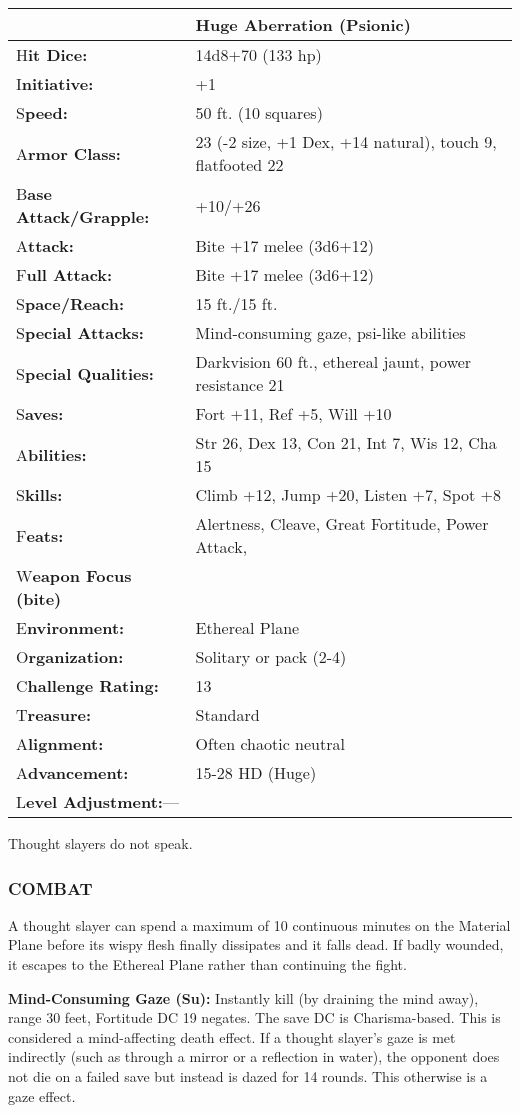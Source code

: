 \documentclass{article}
\begin{document}
\begin{tabular}{|>{\raggedright}p{91pt}|>{\raggedright}p{222pt}|}
\hline
  & Huge Aberration (Psionic)\tabularnewline
\hline
H\textbf{it Dice:} & 14d8+70 (133 hp)\tabularnewline
\hline
I\textbf{nitiative:} & +1\tabularnewline
\hline
S\textbf{peed:} & 50 ft. (10 squares)\tabularnewline
\hline
A\textbf{rmor Class:} & 23 (-2 size, +1 Dex, +14 natural), touch 9, flatfooted 
22\tabularnewline
\hline
B\textbf{ase Attack/Grapple:} & +10/+26\tabularnewline
\hline
A\textbf{ttack:} & Bite +17 melee (3d6+12)\tabularnewline
\hline
F\textbf{ull Attack:} & Bite +17 melee (3d6+12)\tabularnewline
\hline
S\textbf{pace/Reach:} & 15 ft./15 ft.\tabularnewline
\hline
S\textbf{pecial Attacks:} & Mind-consuming gaze, psi-like abilities\tabularnewline
\hline
S\textbf{pecial Qualities:} & Darkvision 60 ft., ethereal jaunt, power resistance 
21\tabularnewline
\hline
S\textbf{aves:} & Fort +11, Ref +5, Will +10\tabularnewline
\hline
A\textbf{bilities:} & Str 26, Dex 13, Con 21, Int 7, Wis 12, Cha 15\tabularnewline
\hline
S\textbf{kills:} & Climb +12, Jump +20, Listen +7, Spot +8\tabularnewline
\hline
F\textbf{eats:} & Alertness, Cleave, Great Fortitude, Power Attack,\tabularnewline
\hline
W\textbf{eapon Focus (bite)} & \tabularnewline
\hline
E\textbf{nvironment:} & Ethereal Plane\tabularnewline
\hline
O\textbf{rganization:} & Solitary or pack (2-4)\tabularnewline
\hline
C\textbf{hallenge Rating:} & 13\tabularnewline
\hline
T\textbf{reasure:} & Standard\tabularnewline
\hline
A\textbf{lignment:} & Often chaotic neutral\tabularnewline
\hline
A\textbf{dvancement:} & 15-28 HD (Huge)\tabularnewline
\hline
L\textbf{evel Adjustment:}--- & \tabularnewline
\hline
\end{tabular}

Thought slayers do not speak.

\subsubsection*{COMBAT}

A thought slayer can spend a maximum of 10 continuous minutes on the Material Plane 
before its wispy flesh finally dissipates and it falls dead. If badly wounded, 
it escapes to the Ethereal Plane rather than continuing the fight.

\textbf{Mind-Consuming Gaze (Su):} Instantly kill (by draining the mind away), 
range 30 feet, Fortitude DC 19 negates. The save DC is Charisma-based. This is 
considered a mind-affecting death effect. If a thought slayer's gaze is met indirectly 
(such as through a mirror or a reflection in water), the opponent does not die 
on a failed save but instead is dazed for 14 rounds. This otherwise is a gaze effect\textit{.}
\end{document}
